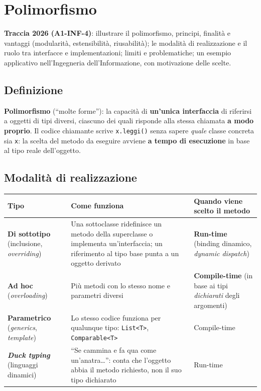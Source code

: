 \section{Polimorfismo}
\textbf{Traccia 2026 (A1-INF-4)}: illustrare il polimorfismo, principi, finalità e vantaggi (modularità, estensibilità, riusabilità); le modalità di realizzazione e il ruolo tra interfacce e implementazioni; limiti e problematiche; un esempio applicativo nell'Ingegneria dell'Informazione, con motivazione delle scelte.

\subsection{Definizione}
\textbf{Polimorfismo} (``molte forme''): la capacità di \textbf{un'unica interfaccia} di riferirsi a oggetti di tipi diversi, ciascuno dei quali risponde alla stessa chiamata \textbf{a modo proprio}. Il codice chiamante scrive \texttt{x.leggi()} senza sapere \emph{quale} classe concreta sia \texttt{x}: la scelta del metodo da eseguire avviene \textbf{a tempo di esecuzione} in base al tipo reale dell'oggetto.

\subsection{Modalità di realizzazione}
\begin{center}
\small
\begin{tabularx}{\textwidth}{@{}>{\raggedright\arraybackslash}p{3.2cm}XX@{}}
\toprule
\textbf{Tipo} & \textbf{Come funziona} & \textbf{Quando viene scelto il metodo} \\
\midrule
\textbf{Di sottotipo} (inclusione, \emph{overriding}) & Una sottoclasse ridefinisce un metodo della superclasse o implementa un'interfaccia; un riferimento al tipo base punta a un oggetto derivato & \textbf{Run-time} (binding dinamico, \emph{dynamic dispatch}) \\
\textbf{Ad hoc} (\emph{overloading}) & Più metodi con lo stesso nome e parametri diversi & \textbf{Compile-time} (in base ai tipi \emph{dichiarati} degli argomenti) \\
\textbf{Parametrico} (\emph{generics}, \emph{template}) & Lo stesso codice funziona per qualunque tipo: \texttt{List<T>}, \texttt{Comparable<T>} & Compile-time \\
\textbf{\emph{Duck typing}} (linguaggi dinamici) & ``Se cammina e fa qua come un'anatra\ldots'': conta che l'oggetto abbia il metodo richiesto, non il suo tipo dichiarato & Run-time \\
\bottomrule
\end{tabularx}
\end{center}

